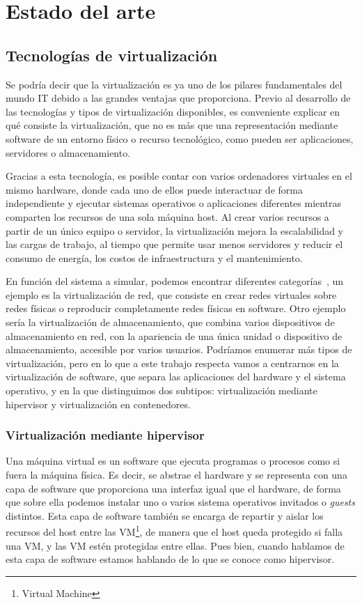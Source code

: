 \chapter{Estado del arte} \label{ch:estado}
\section{Tecnologías de virtualización} \label{sec:virt}
Se podría decir que la virtualización es ya uno de los pilares fundamentales del mundo IT debido a las grandes ventajas que proporciona. Previo al desarrollo de las tecnologías y tipos de virtualización disponibles, es conveniente explicar en qué consiste la virtualización, que no es más que una representación mediante software de un entorno físico o recurso tecnológico, como pueden ser aplicaciones, servidores o almacenamiento.~\cite{virt1} 

Gracias a esta tecnología, es posible contar con varios ordenadores virtuales en el mismo hardware, donde cada uno de ellos puede interactuar de forma independiente y ejecutar sistemas operativos o aplicaciones diferentes mientras comparten los recursos de una sola máquina host. Al crear varios recursos a partir de un único equipo o servidor, la virtualización mejora la escalabilidad y las cargas de trabajo, al tiempo que permite usar menos servidores y reducir el consumo de energía, los costos de infraestructura y el mantenimiento.

En función del sistema a simular, podemos encontrar diferentes categorías~\cite{virt2}, un ejemplo es la virtualización de red, que consiste en crear redes virtuales sobre redes físicas o reproducir completamente redes físicas en software. Otro ejemplo sería la virtualización de almacenamiento, que combina varios dispositivos de almacenamiento en red, con la apariencia de una única unidad o dispositivo de almacenamiento, accesible por varios usuarios. Podríamos enumerar más tipos de virtualización, pero en lo que a este trabajo respecta vamos a centrarnos en la virtualización de software, que separa las aplicaciones del hardware y el sistema operativo, y en la que distinguimos dos subtipos: virtualización mediante hipervisor y virtualización en contenedores.

\subsection{Virtualización mediante hipervisor} \label{sec:hiperv}
Una máquina virtual es un software que ejecuta programas o procesos como si fuera la máquina física. Es decir, se abstrae el hardware y se representa con una capa de software que proporciona una interfaz igual que el hardware, de forma que sobre ella podemos instalar uno o varios sistema operativos invitados o \textit{guests} distintos. Esta capa de software también se encarga de repartir y aislar los recursos del host entre las VM\footnote{Virtual Machine}, de manera que el host queda protegido si falla una VM, y las VM estén protegidas entre ellas. Pues bien, cuando hablamos de esta capa de software estamos hablando de lo que se conoce como hipervisor. 

